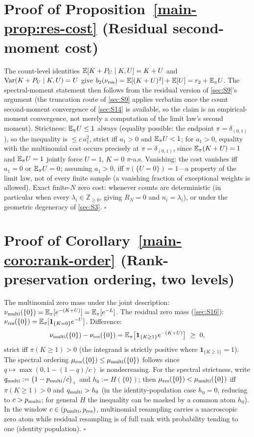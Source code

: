 \section{Proof of Proposition~\ref{main-prop:res-cost} (Residual second-moment cost)}\label{sec:S17}

The count-level identities $\mathbb{E}[K+P_U\mid K,U]=K+U$ and $\operatorname{Var}(K+P_U\mid K,U)=U$ give $b_2(\nu_{\rm res})=\mathbb{E}[(K+U)^2]+\mathbb{E}[U]=r_2+\mathbb{E}_\pi U$. The spectral-moment statement then follows from the residual version of \ref{sec:S9}'s argument (the truncation route of \ref{sec:S9} applies verbatim once the count second-moment convergence of \ref{sec:S14} is available, so the claim is an empirical-moment convergence, not merely a computation of the limit law's second moment). Strictness: $\mathbb{E}_\pi U\le1$ always (equality possible: the endpoint $\pi=\delta_{(0,1)}$), so the inequality is $\le c\,a_1^2$, strict iff $a_1>0$ and $\mathbb{E}_\pi U<1$; for $a_1>0$, equality with the multinomial cost occurs precisely at $\pi=\delta_{(0,1)}$, since $\mathbb{E}_\pi(K+U)=1$ and $\mathbb{E}_\pi U=1$ jointly force $U=1$, $K=0$ $\pi$-a.s. Vanishing: the cost vanishes iff $a_1=0$ or $\mathbb{E}_\pi U=0$; assuming $a_1>0$, iff $\pi(\{U=0\})=1$—a property of the limit law, not of every finite sample (a vanishing fraction of exceptional weights is allowed). Exact finite-$N$ zero cost: whenever counts are deterministic (in particular when every $\lambda_i\in\mathbb Z_{\ge0}$, giving $R_N=0$ and $n_i=\lambda_i$), or under the geometric degeneracy of \ref{sec:S3}. $\square$

\section{Proof of Corollary~\ref{main-coro:rank-order} (Rank-preservation ordering, two levels)}\label{sec:S18}

The multinomial zero mass under the joint description: $\nu_{\rm multi}(\{0\})=\mathbb{E}_\pi[e^{-(K+U)}]=\mathbb{E}_\pi[e^{-L}]$. The residual zero mass (\ref{sec:S16}): $\nu_{\rm res}(\{0\})=\mathbb{E}_\pi[\mathbf 1_{\{K=0\}}e^{-U}]$. Difference:
\[
\nu_{\rm multi}(\{0\})-\nu_{\rm res}(\{0\})=\E_\pi\big[\mathbf 1_{\{K\ge1\}}e^{-(K+U)}\big]\ \ge\ 0,
\]
strict iff $\pi(K\ge1)>0$ (the integrand is strictly positive where $\mathbf 1_{\{K\ge1\}}=1$). The spectral ordering $\mu_{\rm res}(\{0\})\le\mu_{\rm multi}(\{0\})$ follows since $q\mapsto\max(0,1-(1-q)/c)$ is nondecreasing. For the spectral strictness, write $q_{\rm multi}:=\big(1-p_{\rm multi}/c\big)_+$ and $h_0:=H(\{0\})$; then $\mu_{\rm res}(\{0\})<\mu_{\rm multi}(\{0\})$ iff $\pi(K\ge1)>0$ and $q_{\rm multi}>h_0$ (in the identity-population case $h_0=0$, reducing to $c>p_{\rm multi}$; for general $H$ the inequality can be masked by a common atom $h_0$). In the window $c\in(p_{\rm multi},p_{\rm res})$, multinomial resampling carries a macroscopic zero atom while residual resampling is of full rank with probability tending to one (identity population). $\square$


